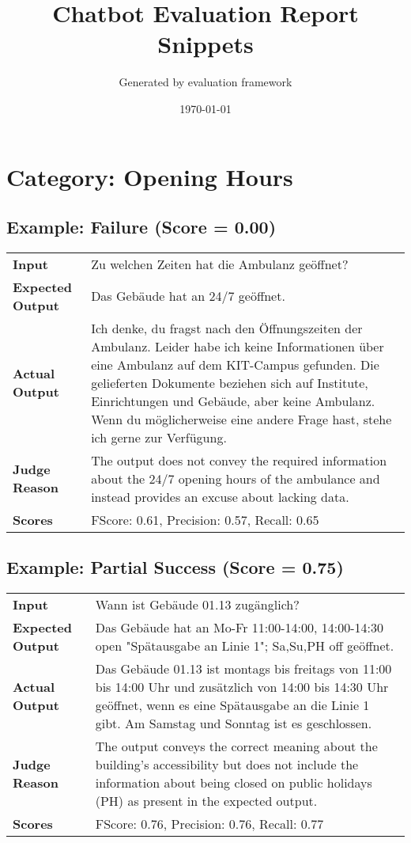 \documentclass{article}
\title{Chatbot Evaluation Report Snippets}
\author{Generated by evaluation framework}
\date{\today}
\begin{document}
\maketitle
\section*{Category: Opening Hours}
\subsection*{Example: Failure (Score = 0.00)}
\begin{longtable}{p{} p{}}
\textbf{Input} & Zu welchen Zeiten hat die Ambulanz geöffnet? \\
\textbf{Expected Output} & Das Gebäude hat an 24/7 geöffnet. \\
\textbf{Actual Output} & Ich denke, du fragst nach den Öffnungszeiten der Ambulanz. Leider habe ich keine Informationen über eine Ambulanz auf dem KIT-Campus gefunden. Die gelieferten Dokumente beziehen sich auf Institute, Einrichtungen und Gebäude, aber keine Ambulanz. Wenn du möglicherweise eine andere Frage hast, stehe ich gerne zur Verfügung. \\
\textbf{Judge Reason} & The output does not convey the required information about the 24/7 opening hours of the ambulance and instead provides an excuse about lacking data. \\
\textbf{Scores} & FScore: 0.61, Precision: 0.57, Recall: 0.65 \\
\end{longtable}
\subsection*{Example: Partial Success (Score = 0.75)}
\begin{longtable}{p{} p{}}
\textbf{Input} & Wann ist Gebäude 01.13 zugänglich? \\
\textbf{Expected Output} & Das Gebäude hat an Mo-Fr 11:00-14:00, 14:00-14:30 open "Spätausgabe an Linie 1"; Sa,Su,PH off geöffnet. \\
\textbf{Actual Output} & Das Gebäude 01.13 ist montags bis freitags von 11:00 bis 14:00 Uhr und zusätzlich von 14:00 bis 14:30 Uhr geöffnet, wenn es eine Spätausgabe an die Linie 1 gibt. Am Samstag und Sonntag ist es geschlossen. \\
\textbf{Judge Reason} & The output conveys the correct meaning about the building's accessibility but does not include the information about being closed on public holidays (PH) as present in the expected output. \\
\textbf{Scores} & FScore: 0.76, Precision: 0.76, Recall: 0.77 \\
\end{longtable}
\end{document}
